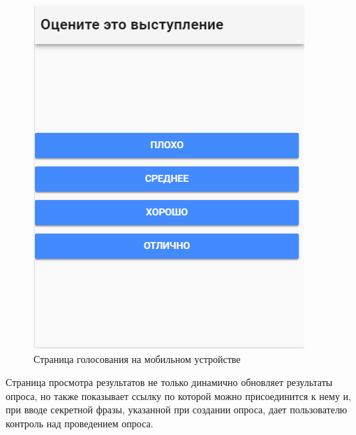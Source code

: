 \begin{figure}[H]
	\centering
	\includegraphics[scale=0.8]{img/slave.PNG}
	\caption{\label{fig:slave} Страница голосования на мобильном устройстве}
\end{figure}
Страница просмотра результатов не только динамично обновляет результаты опроса, но также показывает ссылку по которой можно присоединится к нему и, при вводе секретной фразы, указанной при создании опроса, дает пользователю контроль над проведением опроса.

